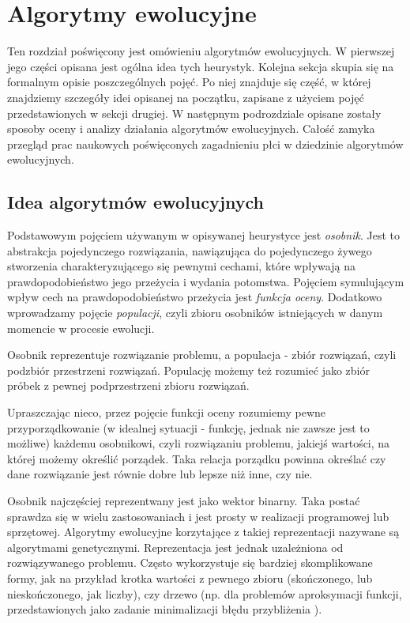 \documentclass[./FM_mgr.tex]{subfiles}
\begin{document}
\chapter{Algorytmy ewolucyjne} \label{chapter:eaDesc}

Ten rozdział poświęcony jest omówieniu algorytmów ewolucyjnych.
W pierwszej jego części opisana jest ogólna idea tych heurystyk. 
Kolejna sekcja skupia się na formalnym opisie poszczególnych pojęć.
Po niej znajduje się część, w której znajdziemy szczegóły idei opisanej na początku, zapisane z użyciem pojęć przedstawionych w sekcji drugiej.
W następnym podrozdziale opisane zostały sposoby oceny i analizy działania algorytmów ewolucyjnych.
Całość zamyka przegląd prac naukowych poświęconych zagadnieniu płci w dziedzinie algorytmów ewolucyjnych.

\section{Idea algorytmów ewolucyjnych} \label{section:general_idea}

Podstawowym pojęciem używanym w opisywanej heurystyce jest \emph{osobnik}. 
Jest to abstrakcja pojedynczego rozwiązania, nawiązująca do pojedynczego żywego stworzenia charakteryzującego się pewnymi cechami, które wpływają na prawdopodobieństwo jego przeżycia i wydania potomstwa. 
Pojęciem symulującym wpływ cech na prawdopodobieństwo przeżycia jest \emph{funkcja oceny}. 
Dodatkowo wprowadzamy pojęcie \emph{populacji}, czyli zbioru osobników istniejących w danym momencie w procesie ewolucji.

Osobnik reprezentuje rozwiązanie problemu, a populacja - zbiór rozwiązań, czyli podzbiór przestrzeni rozwiązań.
Populację możemy też rozumieć jako zbiór próbek z pewnej podprzestrzeni zbioru rozwiązań.

Upraszczając nieco, przez pojęcie funkcji oceny rozumiemy pewne przyporządkowanie (w idealnej sytuacji - funkcję, jednak nie zawsze jest to możliwe) każdemu osobnikowi, czyli rozwiązaniu problemu, jakiejś wartości, na której możemy określić porządek.
Taka relacja porządku powinna określać czy dane rozwiązanie jest równie dobre lub lepsze niż inne, czy nie.

Osobnik najczęściej reprezentwany jest jako wektor binarny.
Taka postać sprawdza się w wielu zastosowaniach i jest prosty w realizacji programowej lub sprzętowej. 
Algorytmy ewolucyjne korzytające z takiej reprezentacji nazywane są algorytmami genetycznymi. 
Reprezentacja jest jednak uzależniona od rozwiązywanego problemu. 
Często wykorzystuje się bardziej skomplikowane formy, jak na przykład krotka wartości z pewnego zbioru (skończonego, lub nieskończonego, jak liczby), czy drzewo \cite{gen_prog} (np. dla problemów aproksymacji funkcji, przedstawionych jako zadanie minimalizacji błędu przybliżenia \cite{gen_prog_foo_approx}).
\end{document}
